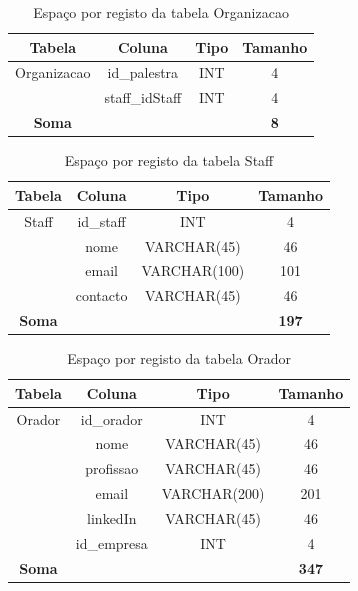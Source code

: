 \documentclass[12pt,a4paper]{article}
\renewcommand{\arraystretch}{1.5}  %
\begin{document}
\begin{table}[H]
\centering
\renewcommand{\arraystretch}{1.2}
\begin{tabular}{|c|c|c|c|}
\hline
\textbf{Tabela} & \textbf{Coluna} & \textbf{Tipo} & \textbf{Tamanho} \\ \hline
Organizacao & id\_palestra & INT & 4 \\ \hline
& staff\_idStaff & INT & 4 \\ \hline
\textbf{Soma} & & & \textbf{8} \\ \hline
\end{tabular}
\caption{Espaço por registo da tabela Organizacao}
\end{table}

\begin{table}[H]
\centering
\renewcommand{\arraystretch}{1.2}
\begin{tabular}{|c|c|c|c|}
\hline
\textbf{Tabela} & \textbf{Coluna} & \textbf{Tipo} & \textbf{Tamanho} \\ \hline
Staff & id\_staff & INT & 4 \\ \hline
& nome & VARCHAR(45) & 46 \\ \hline
& email & VARCHAR(100) & 101 \\ \hline
& contacto & VARCHAR(45) & 46 \\ \hline
\textbf{Soma} & & & \textbf{197} \\ \hline
\end{tabular}
\caption{Espaço por registo da tabela Staff}
\end{table}

\begin{table}[H]
\centering
\renewcommand{\arraystretch}{1.2}
\begin{tabular}{|c|c|c|c|}
\hline
\textbf{Tabela} & \textbf{Coluna} & \textbf{Tipo} & \textbf{Tamanho} \\ \hline
Orador & id\_orador & INT & 4 \\ \hline
& nome & VARCHAR(45) & 46 \\ \hline
& profissao & VARCHAR(45) & 46 \\ \hline
& email & VARCHAR(200) & 201 \\ \hline
& linkedIn & VARCHAR(45) & 46 \\ \hline
& id\_empresa & INT & 4 \\ \hline
\textbf{Soma} & & & \textbf{347} \\ \hline
\end{tabular}
\caption{Espaço por registo da tabela Orador}
\end{table}
\end{document}
